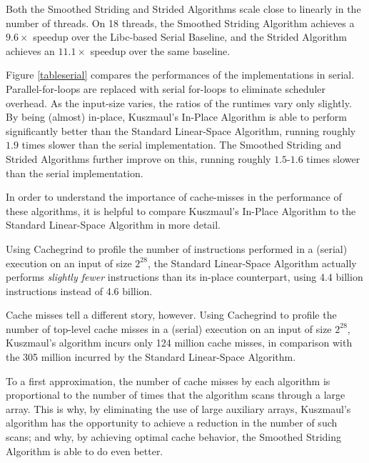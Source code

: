 \documentclass[11pt]{article}
\renewcommand{\paragraph}[1]{\vspace{0.09in}\noindent{\bf \boldmath #1.}}
\theoremstyle{remark}
\theoremstyle{remark}
\begin{document}
Both the Smoothed Striding and Strided Algorithms scale close to
linearly in the number of threads. On 18 threads, the Smoothed
Striding Algorithm achieves a $9.6 \times $ speedup over the
Libc-based Serial Baseline, and the Strided Algorithm achieves an
$11.1 \times$ speedup over the same baseline.

Figure \ref{tableserial} compares the performances of the
implementations in serial. Parallel-for-loops are replaced with serial
for-loops to eliminate scheduler overhead. As the input-size varies,
the ratios of the runtimes vary only slightly. By being (almost)
in-place, Kuszmaul's In-Place Algorithm is able to perform
significantly better than the Standard Linear-Space Algorithm, running
roughly $1.9$ times slower than the serial implementation. The
Smoothed Striding and Strided Algorithms further improve on this,
running roughly $1.5$-$1.6$ times slower than the serial
implementation. 

\paragraph{Understanding the bottleneck: cache-misses}
In order to understand the importance of cache-misses in the
performance of these algorithms, it is helpful to compare Kuszmaul's
In-Place Algorithm to the Standard Linear-Space Algorithm in more
detail.

Using Cachegrind to profile the number of instructions performed in a
(serial) execution on an input of size $2^{28}$, the Standard
Linear-Space Algorithm actually performs \emph{slightly fewer}
instructions than its in-place counterpart, using 4.4 billion
instructions instead of 4.6 billion.

Cache misses tell a different story, however. Using Cachegrind to
profile the number of top-level cache misses in a (serial) execution
on an input of size $2^{28}$, Kuszmaul's algorithm incurs
only 124 million cache misses, in comparison with the 305 million
incurred by the Standard Linear-Space Algorithm. 

To a first approximation, the number of cache misses by each algorithm
is proportional to the number of times that the algorithm scans
through a large array. This is why, by eliminating the use of large
auxiliary arrays, Kuszmaul's algorithm has the
opportunity to achieve a reduction in the number of such scans; and
why, by achieving optimal cache behavior, the Smoothed Striding
Algorithm is able to do even better.
\end{document}
